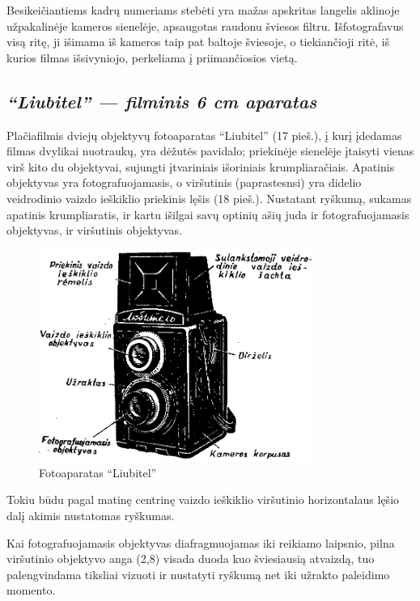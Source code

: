 \documentclass[12pt]{book}
\begin{document}
			Besikeičiantiems kadrų numeriams stebėti yra mažas apskritas langelis aklinoje užpakalinėje kameros sienelėje, apsaugotas raudonu šviesos filtru. Išfotografavus visą ritę, ji išimama iš kameros taip pat baltoje šviesoje, o tiekiančioji ritė, iš kurios filmas išsivyniojo, perkeliama į priimančiosios vietą.
		\subsection*{\textit{``Liubitel'' --- filminis 6  cm aparatas}}
			Plačiafilmis dviejų objektyvų fotoaparatas ``Liubitel'' (17 pieš.), į kurį įdedamas filmas dvylikai nuotraukų, yra dėžutės pavidalo; priekinėje sienelėje įtaisyti vienas virš kito du objektyvai, sujungti įtvariniais išoriniais krumpliaračiais. Apatinis objektyvas yra fotografuojamasis, o viršutinis (paprastesnsi) yra didelio veidrodinio vaizdo ieškiklio priekinis lęšis (18 pieš.). Nustatant ryškumą, sukamas apatinis krumpliaratis, ir kartu išilgai savų optinių ašių juda ir fotografuojamasis objektyvas, ir viršutinis objektyvas.
			\begin{figure}[h]
				\centering
				\includegraphics[width=0.8\textwidth]{17-pav}
				\caption{Fotoaparatas ``Liubitel''}
				\label{fig:17}
			\end{figure}

			Tokiu būdu pagal matinę centrinę vaizdo ieškiklio viršutinio horizontalaus lęšio dalį akimis nustatomas ryškumas.

			Kai fotografuojamasis objektyvas diafragmuojamas iki reikiamo laipsnio, pilna viršutinio objektyvo anga (2,8) visada duoda kuo šviesiausią atvaizdą, tuo palengvindama tiksliai vizuoti ir nustatyti ryškumą net iki užrakto paleidimo momento.
\end{document}
